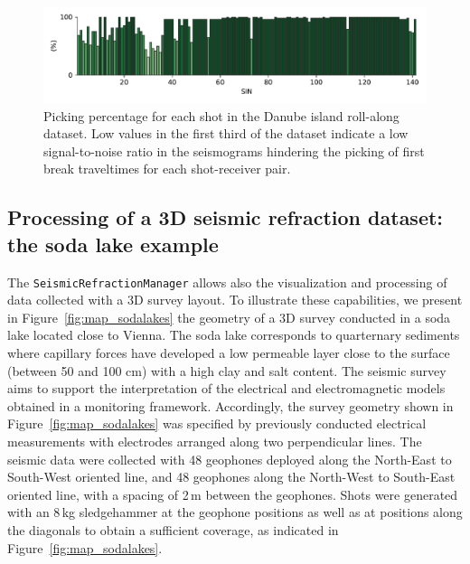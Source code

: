 \documentclass[a4paper,fleqn]{cas-sc}
\begin{document}
\begin{figure}
	\centering
	\includegraphics[width=.75\textwidth]{figures/rollalong_pickperc.pdf}
	\caption{Picking percentage for each shot in the Danube island roll-along dataset. Low values in the first third of the dataset indicate a low signal-to-noise ratio in the seismograms hindering the picking of first break traveltimes for each shot-receiver pair.}
	\label{fig:rollalong_pickperc}
\end{figure}
\subsection{Processing of a 3D seismic refraction dataset: the soda lake example}

The \texttt{SeismicRefractionManager} allows also the visualization and processing of data collected with a 3D survey layout. To illustrate these capabilities, we present in Figure~\ref{fig:map_sodalakes} the geometry of a 3D survey conducted in a soda lake located close to Vienna. The soda lake corresponds to quarternary sediments where capillary forces have developed a low permeable layer close to the surface (between 50 and 100 cm) with a high clay and salt content.
The seismic survey aims to support the interpretation of the electrical and electromagnetic models obtained in a monitoring framework. 
Accordingly, the survey geometry shown in Figure~\ref{fig:map_sodalakes} was specified by previously conducted electrical measurements with electrodes arranged along two perpendicular lines. The seismic data were collected with 48 geophones deployed along the North-East to South-West oriented line, and 48 geophones along the North-West to South-East oriented line, with a spacing of 2\,m between the geophones. Shots were generated with an 8\,kg sledgehammer at the geophone positions as well as at positions along the diagonals to obtain a sufficient coverage, as indicated in Figure~\ref{fig:map_sodalakes}.
\end{document}
